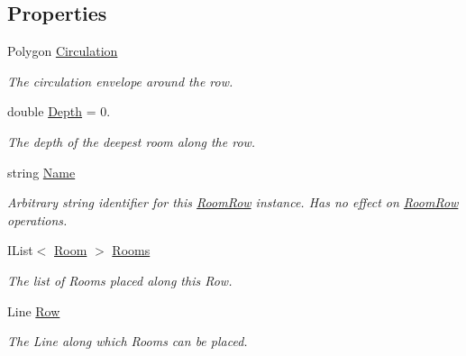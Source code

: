 \subsection*{Properties}
\begin{DoxyCompactItemize}
\item 
Polygon \mbox{\hyperlink{class_room_kit_1_1_room_row_a599df29134a583704e48d2f7b59cb244}{Circulation}}
\begin{DoxyCompactList}\small\item\em The circulation envelope around the row. \end{DoxyCompactList}\item 
double \mbox{\hyperlink{class_room_kit_1_1_room_row_a3c5718e6696e88c4c0f91154751f59f8}{Depth}} = 0.
\begin{DoxyCompactList}\small\item\em The depth of the deepest room along the row. \end{DoxyCompactList}\item 
string \mbox{\hyperlink{class_room_kit_1_1_room_row_a99bed9136ed8a01c5174e734c24a264e}{Name}}
\begin{DoxyCompactList}\small\item\em Arbitrary string identifier for this \mbox{\hyperlink{class_room_kit_1_1_room_row}{Room\+Row}} instance. Has no effect on \mbox{\hyperlink{class_room_kit_1_1_room_row}{Room\+Row}} operations. \end{DoxyCompactList}\item 
I\+List$<$ \mbox{\hyperlink{class_room_kit_1_1_room}{Room}} $>$ \mbox{\hyperlink{class_room_kit_1_1_room_row_aa4f80369bb6d0fbf1ae8d5cc31998383}{Rooms}}
\begin{DoxyCompactList}\small\item\em The list of Rooms placed along this Row. \end{DoxyCompactList}\item 
Line \mbox{\hyperlink{class_room_kit_1_1_room_row_a5101187caa26266fe0e1487cc6187cd9}{Row}}
\begin{DoxyCompactList}\small\item\em The Line along which Rooms can be placed. \end{DoxyCompactList}\item 

\end{DoxyCompactItemize}
